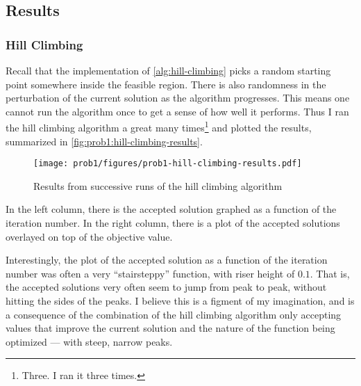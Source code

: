 \documentclass{article}
\begin{document}
\subsection{Results}

\subsubsection{Hill Climbing}

Recall that the implementation of \autoref{alg:hill-climbing} picks a random starting point
somewhere inside the feasible region. There is also randomness in the perturbation of the current
solution as the algorithm progresses. This means one cannot run the algorithm once to get a sense
of how well it performs. Thus I ran the hill climbing algorithm a great many times\footnote{Three.
    I ran it three times.} and plotted the results, summarized in
\autoref{fig:prob1:hill-climbing-results}.

\begin{figure}[H]
    \centering
    \texttt{[image: prob1/figures/prob1-hill-climbing-results.pdf]}
    \caption{Results from successive runs of the hill climbing
        algorithm}\label{fig:prob1:hill-climbing-results}
\end{figure}

In the left column, there is the accepted solution graphed as a function of the iteration number.
In the right column, there is a plot of the accepted solutions overlayed on top of the objective
value.

Interestingly, the plot of the accepted solution as a function of the iteration number was often a
very ``stairsteppy'' function, with riser height of $0.1$. That is, the accepted solutions very
often seem to jump from peak to peak, without hitting the sides of the peaks. I believe this is a
figment of my imagination, and is a consequence of the combination of the hill climbing algorithm
only accepting values that improve the current solution and the nature of the function being
optimized --- with steep, narrow peaks.
\end{document}
